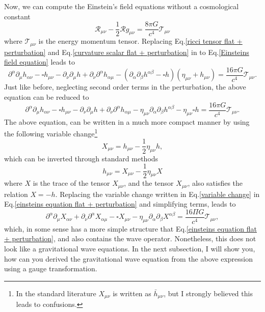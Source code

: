 \documentclass{article}
\begin{document}
Now, we can compute the Einstein's field equations without a cosmological constant
\begin{equation}
    \label{Einsteins field equation}
    \mathcal{R}_{\mu\nu} - \frac{1}{2}\mathcal{R}g_{\mu\nu} = \frac{8\pi G}{c^4}
    \mathcal{T}_{\mu\nu}
\end{equation}
where $\mathcal{T}_{\mu\nu}$ is the energy momentum tensor. Replacing 
Eq.\eqref{ricci tensor flat + perturbation} and Eq.\eqref{curvature scalar flat + perturbation}
in to Eq.\eqref{Einsteins field equation} leads to
\begin{equation}
        \partial^{\alpha}\partial_{\mu}h_{\alpha\nu} 
        -  \square h_{\mu\nu} - \partial_{\nu}\partial_{\mu}h
        + \partial_{\nu}\partial^{\alpha}h_{\alpha\mu}
        - \left(\partial_{\alpha}\partial_{\beta}h^{\alpha\beta} - \square h\right)
        \left(\eta_{\mu\nu} + h_{\mu\nu}\right) = \frac{16\pi G}{c^4}\mathcal{T}_{\mu\nu}.
\end{equation}
Just like before, neglecting second order terms in the perturbation, the above equation
can be reduced to
\begin{equation}
    \label{einsteins equation flat + perturbation}
        \partial^{\alpha}\partial_{\mu}h_{\alpha\nu} 
        -  \square h_{\mu\nu} - \partial_{\nu}\partial_{\mu}h
        + \partial_{\nu}\partial^{\alpha}h_{\alpha\mu}
        - \eta_{\mu\nu}\partial_{\alpha}\partial_{\beta}h^{\alpha\beta} 
        - \eta_{\mu\nu}\square h = \frac{16\pi G}{c^4}\mathcal{T}_{\mu\nu}.
\end{equation}
The above equation, can be written in a much more compact manner by using the following
variable change\footnote{In the standard literature $X_{\mu\nu}$ is written as 
$\bar{h}_{\mu\nu}$, but I strongly believed this leads to confusions.}
\begin{equation}
    X_{\mu\nu} = h_{\mu\nu} - \frac{1}{2}\eta_{\mu\nu}h,
\end{equation}
which can be inverted through standard methods
\begin{equation}
    \label{variable change}
    h_{\mu\nu} = X_{\mu\nu} - \frac{1}{2}\eta_{\mu\nu}X
\end{equation}
where $X$ is the trace of the tensor $X_{\mu\nu}$, and the tensor $X_{\mu\nu}$, also satisfies
the relation $X = -h$. Replacing the variable change written in Eq.\eqref{variable change} in 
Eq.\eqref{einsteins equation flat + perturbation} and simplifying terms, leads to
\begin{equation}
    \label{efe X}
    \partial^{\alpha}\partial_{\mu}X_{\alpha\nu} + \partial_{\nu}\partial^{\alpha}X_{\alpha\mu}
    - \square X_{\mu\nu} - \eta_{\mu\nu}\partial_{\alpha}\partial_{\beta}X^{\alpha\beta}
    =  \frac{16\Pi G}{c^4}\mathcal{T}_{\mu\nu},
\end{equation}
which, in some sense has a more simple structure that Eq.\eqref{einsteins equation flat + perturbation},
and also contains the wave operator. Nonetheless, this does not look like a gravitational 
wave equations. In the next subsection, I will show you, how can you derived the gravitational
wave equation from the above expression using a gauge transformation.
\end{document}

